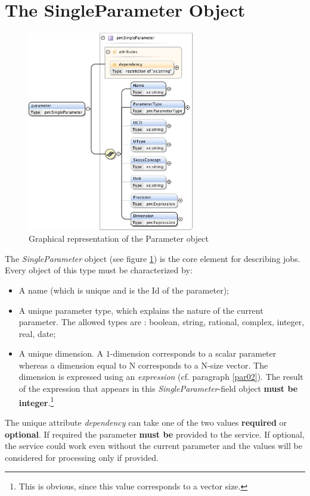 \documentclass[a4paper,11pt] {ivoa}
\begin{document}
\section{The SingleParameter Object}\label{par01}

\begin{figure}[htbp]
\begin{center}
\includegraphics[width=0.65\textwidth]{pictures/Parameter.jpg} 
\caption{Graphical representation of the Parameter object}
\label{Pic-Parameter}
\end{center}
\end{figure}

The {\it SingleParameter} object (see figure \ref{Pic-Parameter}) is the core element for describing
jobs.
Every object of this type must be characterized by:
\begin{itemize}
\item A name (which is unique and is the Id of the parameter);
\item A unique parameter type, which explains the nature of the current parameter. The allowed
types are : boolean, string, rational, complex, integer, real, date;
\item A unique dimension. A $1$-dimension corresponds to a scalar parameter whereas a dimension
equal to N corresponds to a N-size vector. The dimension is expressed using an {\it expression} (cf.
paragraph \ref{par02}). The result of the expression that appears in this {\it
SingleParameter}-field object {\bf must be integer}.\footnote{This is obvious, since this value
corresponds to a vector size.}
\end{itemize}
The unique attribute {\it dependency} can take one of the two values {\bf required} or {\bf
optional}. If required the parameter {\bf must be} provided to the service. If optional, the service
could work even without the current parameter and the values will be considered for processing only
if provided.\\
\end{document}
